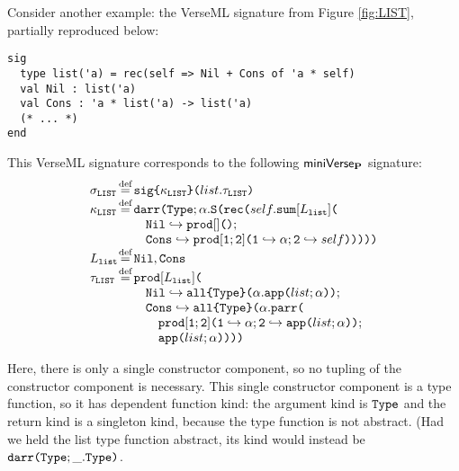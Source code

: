 Consider another example: the VerseML  signature from Figure \ref{fig:LIST}, partially reproduced below:
\begin{lstlisting}
sig 
  type list('a) = rec(self => Nil + Cons of 'a * self)
  val Nil : list('a)
  val Cons : 'a * list('a) -> list('a)
  (* ... *)
end
\end{lstlisting}
This VerseML signature corresponds to the following $\mathsf{miniVerse}_\textbf{P}$ signature:
\[
\arraycolsep=1px\begin{array}{ll}

\sigma_\texttt{LIST} & \defeq \asignature{\kappa_\texttt{LIST}}{list}{\tau_\texttt{LIST}}\\
\kappa_\texttt{LIST} & \defeq \akdarr{\akty}{\alpha}{\aksing{
  \arec{self}{
    \asum{L_\texttt{list}}{\\
    & \quad\quad 
      \mapitem{\lbltxt{Nil}}{\aprod{}{}}; \\
    & \quad\quad 
      \mapitem{\lbltxt{Cons}}{
        \aprod{\lbltxt{1}; \lbltxt{2}}{
          \mapitem{\lbltxt{1}}{\alpha}; 
          \mapitem{\lbltxt{2}}{self}
        }
      }
    }
  } 
}}\\
L_\texttt{list} & \defeq \lbltxt{Nil}, \lbltxt{Cons}\\
\tau_\texttt{LIST} & \defeq \aprod{L_\texttt{list}}{\\&
  \quad\quad \mapitem{\lbltxt{Nil}}{
    \aallu{\akty}{\alpha}{\acapp{list}{\alpha}}
  }; \\&
  \quad\quad \mapitem{\lbltxt{Cons}}{
    \aallu{\akty}{\alpha}{
      \aparr{\\&\quad\quad\quad
        \aprod{\lbltxt{1}; \lbltxt{2}}{
          \mapitem{\lbltxt{1}}{\alpha}; 
          \mapitem{\lbltxt{2}}{\acapp{list}{\alpha}}
        }
      }{\\&\quad\quad\quad
        \acapp{list}{\alpha}
      }
    }
  }
}
\end{array}
\]

Here, there is only a single constructor component, so no tupling of the constructor component is necessary. This single constructor component is a type function, so it has dependent function kind: the argument kind is $\texttt{Type}$ and the return kind is a singleton kind, because the type function is not abstract. (Had we held the list type function abstract, its kind would instead be $\texttt{darr}\texttt{(}\texttt{Type}; \_.\texttt{Type}\texttt{)}$.

